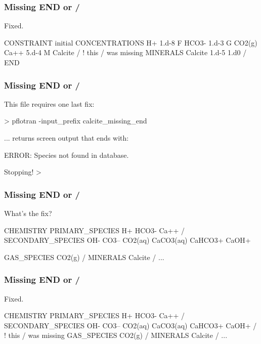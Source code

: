 \documentclass[aspectratio=169]{beamer}
\newcommand\gehcomment[1]{{{\color{orange} #1}}}
\newcommand\redcomment[1]{{{\color{red} #1}}}
\newcommand\bluecomment[1]{{{\color{blue} #1}}}
\newcommand\greencomment[1]{{{\color{green} #1}}}
\newcommand\magentacomment[1]{{{\color{magenta} #1}}}
\begin{document}
\begin{frame}\frametitle{Missing \greencomment{END} or \greencomment{/}}
\redcomment{Fixed.}
\begin{semiverbatim}

CONSTRAINT initial
  CONCENTRATIONS
    H+     1.d-8      F
    HCO3-  1.d-3      G  CO2(g)
    Ca++   5.d-4      M  Calcite
  \magentacomment{/} \bluecomment{! this \greencomment{/} was missing}
  MINERALS
    Calcite 1.d-5 1.d0
  /
END
\end{semiverbatim}

\end{frame}

\begin{frame}\frametitle{Missing \greencomment{END} or \greencomment{/}}
\redcomment{This file requires one last fix:}
\begin{semiverbatim}

> pflotran -input_prefix calcite_missing_end

... \gehcomment{returns screen output that ends with:}

  ERROR: Species not found in database.

  Stopping!
>
\end{semiverbatim}

\end{frame}

\begin{frame}\frametitle{Missing \greencomment{END} or \greencomment{/}}
\redcomment{What's the fix?}
\begin{semiverbatim}
CHEMISTRY
  PRIMARY_SPECIES
    H+
    HCO3-
    Ca++
  /
  SECONDARY_SPECIES
    OH-
    CO3--
    CO2(aq)
    CaCO3(aq)
    CaHCO3+
    CaOH+

  GAS_SPECIES
    CO2(g)
  /
  MINERALS
    Calcite
  /
...
\end{semiverbatim}

\end{frame}

\begin{frame}\frametitle{Missing \greencomment{END} or \greencomment{/}}
\redcomment{Fixed.}
\begin{semiverbatim}
CHEMISTRY
  PRIMARY_SPECIES
    H+
    HCO3-
    Ca++
  /
  SECONDARY_SPECIES
    OH-
    CO3--
    CO2(aq)
    CaCO3(aq)
    CaHCO3+
    CaOH+
  \magentacomment{/} \bluecomment{! this \greencomment{/} was missing}
  GAS_SPECIES
    CO2(g)
  /
  MINERALS
    Calcite
  /
...
\end{semiverbatim}

\end{frame}
\end{document}
